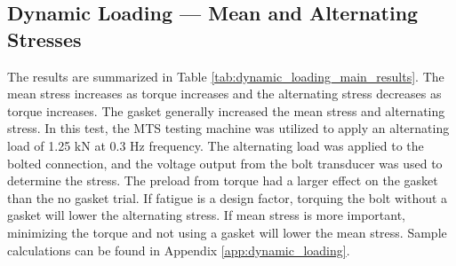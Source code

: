 \subsection{Dynamic Loading --- Mean and Alternating Stresses}
\indent The results are summarized in Table \ref{tab:dynamic_loading_main_results}. The mean stress increases as torque increases and the alternating stress decreases as torque increases. The gasket generally increased the mean stress and alternating stress. In this test, the MTS testing machine was utilized to apply an alternating load of 1.25 kN at 0.3 Hz frequency. The alternating load was applied to the bolted connection, and the voltage output from the bolt transducer was used to determine the stress. The preload from torque had a larger effect on the gasket than the no gasket trial. If fatigue is a design factor, torquing the bolt without a gasket will lower the alternating stress. If mean stress is more important, minimizing the torque and not using a gasket will lower the mean stress. Sample calculations can be found in Appendix \ref{app:dynamic_loading}.